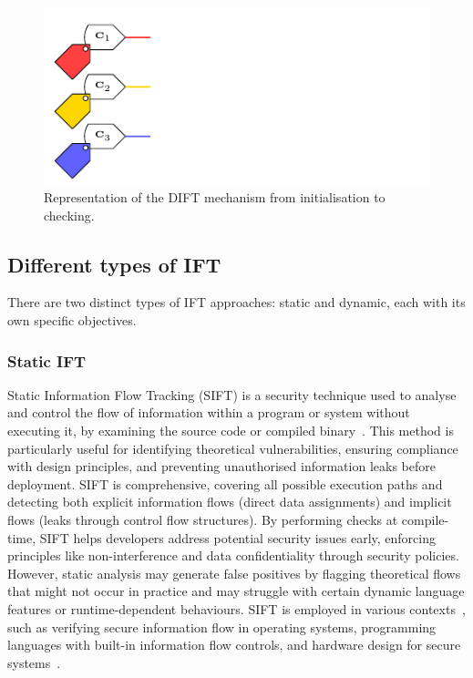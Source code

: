 \begin{figure}[ht]
    \centering
    \includegraphics[page=3]{c2_soa/img/schemaDIFT.pdf}
    \caption{Representation of the DIFT mechanism from initialisation to checking.}
    \label{fig:dift_init}
\end{figure}
    
\subsection{Different types of IFT}
There are two distinct types of IFT approaches: static and dynamic, each with its own specific objectives.

\subsubsection{Static IFT}
Static Information Flow Tracking (SIFT) is a security technique used to analyse and control the flow of information within a program or system without executing it, by examining the source code or compiled binary~\cite{HAK-21-acmcsur}. This method is particularly useful for identifying theoretical vulnerabilities, ensuring compliance with design principles, and preventing unauthorised information leaks before deployment. SIFT is comprehensive, covering all possible execution paths and detecting both explicit information flows (direct data assignments) and implicit flows (leaks through control flow structures). By performing checks at compile-time, SIFT helps developers address potential security issues early, enforcing principles like non-interference and data confidentiality through security policies. However, static analysis may generate false positives by flagging theoretical flows that might not occur in practice and may struggle with certain dynamic language features or runtime-dependent behaviours. SIFT is employed in various contexts~\cite{LMLW-08-pepm}, such as verifying secure information flow in operating systems, programming languages with built-in information flow controls, and hardware design for secure systems~\cite{FXZMS-17-sigarch}.

